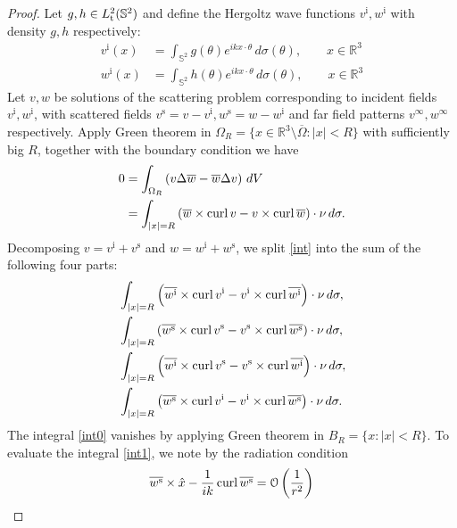 \begin{proof}
  Let $g, h\in L_{\text t}^2(\mathbb{S}^2)$ and define the Hergoltz wave functions $v^\text{i}, w^\text{i}$ with density $g, h$ respectively:
  \begin{align*}
    v^\text{i}(x) &= \int_{\mathbb{S}^2}g(\theta) e^{i k x\cdot\theta}\, d\sigma(\theta),\qquad x\in\mathbb{R}^3 \\
    w^\text{i}(x) &= \int_{\mathbb{S}^2}h(\theta) e^{i k x\cdot\theta}\, d\sigma(\theta),\qquad x\in\mathbb{R}^3 
  \end{align*}
  Let $v, w$ be solutions of the scattering problem corresponding to incident fields $v^\text{i}, w^\text{i}$, with scattered fields $v^\text{s}=v-v^\text{i}, w^\text{s}=w-w^\text{i}$ and far field patterns $v^\infty, w^\infty$ respectively. Apply Green theorem in $\Omega_R=\{x\in\mathbb{R}^3\setminus\overline{\Omega}: |x|<R\}$ with sufficiently big $R$, together with the boundary condition we have
  \begin{align}
    0 &= \int_{\Omega_R}\left(v\Delta\overline{w}-\overline{w}\Delta v\right)\,dV \\
    &= \int_{|x|=R}\left(\overline{w}\times\operatorname{curl}{v} - v\times\operatorname{curl}{\overline{w}}\right)\cdot\nu\,d\sigma.\label{int}
  \end{align} 
  Decomposing $v=v^\text{i}+v^\text{s}$ and $w=w^\text{i}+w^\text{s}$, we split \eqref{int} into the sum of the following four parts:
  \begin{align}
    &\int_{|x|=R}\left(\overline{w^\text{i}}\times\operatorname{curl}{v^\text{i}} - v^\text{i}\times\operatorname{curl}{\overline{w^\text{i}}}\right)\cdot\nu\,d\sigma,\label{int0} \\
    &\int_{|x|=R}\left(\overline{w^\text{s}}\times\operatorname{curl}{v^\text{s}} - v^\text{s}\times\operatorname{curl}{\overline{w^\text{s}}}\right)\cdot\nu\,d\sigma,\label{int1} \\
    &\int_{|x|=R}\left(\overline{w^\text{i}}\times\operatorname{curl}{v^\text{s}} - v^\text{s}\times\operatorname{curl}{\overline{w^\text{i}}}\right)\cdot\nu\,d\sigma,\label{int2} \\
    &\int_{|x|=R}\left(\overline{w^\text{s}}\times\operatorname{curl}{v^\text{i}} - v^\text{i}\times\operatorname{curl}{\overline{w^\text{s}}}\right)\cdot\nu\,d\sigma.\label{int3}
  \end{align}
  The integral \eqref{int0} vanishes by applying Green theorem in $B_R=\{x:|x|<R\}$. To evaluate the integral \eqref{int1}, we note by the radiation condition
  \begin{align}
    \overline{w^\text{s}}\times\hat{x} - \frac{1}{ik} \curl{\overline{w^\text{s}}} &= \mathcal{O}\left(\frac{1}{r^2}\right) \\

\end{align}
\end{proof}
